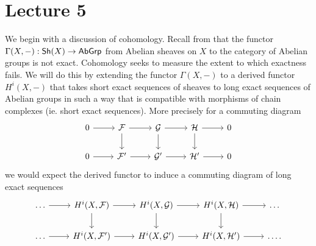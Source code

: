 \section{Lecture 5}\label{sec: lecture 5}
We begin with a discussion of cohomology. Recall from  that the functor $\Gamma(X,-):\mathsf{Sh}(X)\to\mathsf{AbGrp}$ from Abelian sheaves on $X$ to the category of Abelian groups is not exact. Cohomology seeks to measure the extent to which exactness fails. We will do this by extending the functor $\Gamma(X,-)$ to a derived functor $H^{i}(X,-)$ that takes short exact sequences of sheaves to long exact sequences of Abelian groups in such a way that is compatible with morphisms of chain complexes (ie. short exact sequences). More precisely for a commuting diagram 
$$%
\begin{tikzcd}
	0 & \Fcal & \Gcal & \Hcal & 0 \\
	0 & {\Fcal'} & {\Gcal'} & {\Hcal'} & 0
	\arrow[from=1-1, to=1-2]
	\arrow[from=1-2, to=1-3]
	\arrow[from=1-2, to=2-2]
	\arrow[from=1-3, to=1-4]
	\arrow[from=1-3, to=2-3]
	\arrow[from=1-4, to=1-5]
	\arrow[from=1-4, to=2-4]
	\arrow[from=2-1, to=2-2]
	\arrow[from=2-2, to=2-3]
	\arrow[from=2-3, to=2-4]
	\arrow[from=2-4, to=2-5]
\end{tikzcd}$$
we would expect the derived functor to induce a commuting diagram of long exact sequences
$$%
\begin{tikzcd}
	\dots & {H^{i}(X,\Fcal)} & {H^{i}(X,\Gcal)} & {H^{i}(X,\Hcal)} & \dots \\
	\dots & {H^{i}(X,\Fcal')} & {H^{i}(X,\Gcal')} & {H^{i}(X,\Hcal')} & \dots.
	\arrow[from=1-1, to=1-2]
	\arrow[from=1-2, to=1-3]
	\arrow[from=1-2, to=2-2]
	\arrow[from=1-3, to=1-4]
	\arrow[from=1-3, to=2-3]
	\arrow[from=1-4, to=1-5]
	\arrow[from=1-4, to=2-4]
	\arrow[from=2-1, to=2-2]
	\arrow[from=2-2, to=2-3]
	\arrow[from=2-3, to=2-4]
	\arrow[from=2-4, to=2-5]
\end{tikzcd}$$
